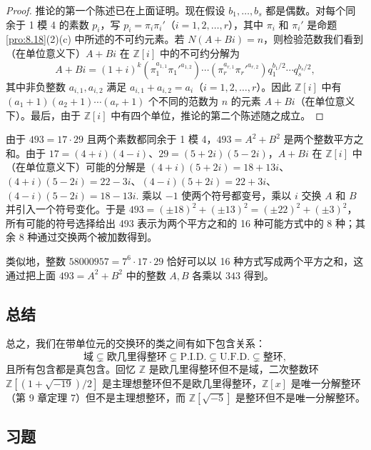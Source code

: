 \begin{proof}
推论的第一个陈述已在上面证明。现在假设 \(b_1, \ldots, b_s\) 都是偶数。对每个同余于 1 模 4 的素数 \(p_i\)，写 \(p_i = \pi_i\pi_i'\)（\(i = 1, 2, \ldots, r\)），其中 \(\pi_i\) 和 \(\pi_i'\) 是命题 \ref{pro:8.18}(2)(c) 中所述的不可约元素。若 \(N(A+Bi) = n\)，则检验范数我们看到（在单位意义下）\(A+Bi\) 在 \(\mathbb{Z}[i]\) 中的不可约分解为
\[
A+Bi = (1+i)^k(\pi_1^{a_{1,1}}\pi_1'^{a_{1,2}})\cdots(\pi_r^{a_{r,1}}\pi_r'^{a_{r,2}})q_1^{b_1/2}\cdots q_s^{b_s/2},
\]
其中非负整数 \(a_{i,1}, a_{i,2}\) 满足 \(a_{i,1}+a_{i,2} = a_i\)（\(i = 1, 2, \ldots, r\)）。因此 \(\mathbb{Z}[i]\) 中有 \((a_1+1)(a_2+1)\cdots(a_r+1)\) 个不同的范数为 \(n\) 的元素 \(A+Bi\)（在单位意义下）。最后，由于 \(\mathbb{Z}[i]\) 中有四个单位，推论的第二个陈述随之成立。
\end{proof}

\begin{example}
由于 \(493 = 17 \cdot 29\) 且两个素数都同余于 1 模 4，\(493 = A^2+B^2\) 是两个整数平方之和。由于 \(17 = (4+i)(4-i)\)、\(29 = (5+2i)(5-2i)\)，\(A+Bi\) 在 \(\mathbb{Z}[i]\) 中（在单位意义下）可能的分解是 \((4+i)(5+2i) = 18+13i\)、\((4+i)(5-2i) = 22-3i\)、\((4-i)(5+2i) = 22+3i\)、\((4-i)(5-2i) = 18-13i\). 乘以 \(-1\) 使两个符号都变号，乘以 \(i\) 交换 \(A\) 和 \(B\) 并引入一个符号变化。于是 \(493 = (\pm 18)^2+(\pm 13)^2 = (\pm 22)^2+(\pm 3)^2\)，所有可能的符号选择给出 493 表示为两个平方之和的 16 种可能方式中的 8 种；其余 8 种通过交换两个被加数得到。

类似地，整数 \(58000957 = 7^6 \cdot 17 \cdot 29\) 恰好可以以 16 种方式写成两个平方之和，这通过把上面 \(493 = A^2+B^2\) 中的整数 \(A, B\) 各乘以 \(343\) 得到。
\end{example}

\subsection*{总结}

总之，我们在带单位元的交换环的类之间有如下包含关系：
\[
\text{域} \subsetneq \text{欧几里得整环} \subsetneq \text{P.I.D.} \subsetneq \text{U.F.D.} \subsetneq \text{整环},
\]
且所有包含都是真包含。回忆 \(\mathbb{Z}\) 是欧几里得整环但不是域，二次整数环 \(\mathbb{Z}[(1+\sqrt{-19})/2]\) 是主理想整环但不是欧几里得整环，\(\mathbb{Z}[x]\) 是唯一分解整环（第 9 章定理 7）但不是主理想整环，而 \(\mathbb{Z}[\sqrt{-5}]\) 是整环但不是唯一分解整环。

\subsection*{习题}

